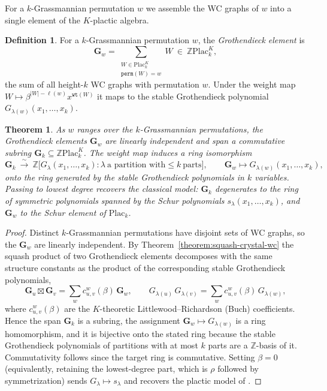 \documentclass{amsart}
\newtheorem{theorem}[lemma]{Theorem}
\theoremstyle{definition}
\newtheorem{definition}[lemma]{Definition}
\theoremstyle{remark}
\numberwithin{equation}{subsection}
\newcommand{\wof}[1]{\mathtt{perm}(#1)}
\newcommand{\wtt}{\mathtt{wt}}
\newcommand{\plac}{\mathrm{Plac}}
\newcommand{\kplac}{\mathrm{Plac}^K}
\begin{document}
For a $k$-Grassmannian permutation $w$ we assemble the WC graphs of $w$ into a
single element of the $K$-plactic algebra.

\begin{definition}\label{definition:groth-element}
For a $k$-Grassmannian permutation $w$, the \emph{Grothendieck element} is
$$\mathbf{G}_w=\sum_{\substack{W\in\kplac_k\\ \wof{W}=w}}W\ \in\ \mathbb{Z}\kplac_k,$$
the sum of all height-$k$ WC graphs with permutation $w$. Under the weight map
$W\mapsto\beta^{|W|-\ell(w)}x^{\wtt(W)}$ it maps to the stable Grothendieck
polynomial $G_{\lambda(w)}(x_1,\ldots,x_k)$.
\end{definition}

\begin{theorem}\label{theorem:groth-subring}
As $w$ ranges over the $k$-Grassmannian permutations, the Grothendieck elements
$\mathbf{G}_w$ are linearly independent and span a commutative subring
$\mathbf{G}_k\subseteq\mathbb{Z}\kplac_k$. The weight map induces a ring
isomorphism
$$\mathbf{G}_k\ \xrightarrow{\ \sim\ }\ \mathbb{Z}\bigl[G_{\lambda}(x_1,\ldots,x_k):\lambda\ \text{a partition with}\le k\ \text{parts}\bigr],\qquad
\mathbf{G}_w\longmapsto G_{\lambda(w)}(x_1,\ldots,x_k),$$
onto the ring generated by the stable Grothendieck polynomials in $k$ variables.
Passing to lowest degree recovers the classical model: $\mathbf{G}_k$ degenerates
to the ring of symmetric polynomials spanned by the Schur polynomials
$s_\lambda(x_1,\ldots,x_k)$, and $\mathbf{G}_w$ to the Schur element of
$\plac_k$.
\end{theorem}
\begin{proof}
Distinct $k$-Grassmannian permutations have disjoint sets of WC graphs, so the
$\mathbf{G}_w$ are linearly independent. By
Theorem~\ref{theorem:squash-crystal-wc} the squash product of two Grothendieck
elements decomposes with the same structure constants as the product of the
corresponding stable Grothendieck polynomials,
$$\mathbf{G}_u\boxtimes\mathbf{G}_v=\sum_{w}c^{w}_{u,v}(\beta)\,\mathbf{G}_w,
\qquad
G_{\lambda(u)}\,G_{\lambda(v)}=\sum_{w}c^{w}_{u,v}(\beta)\,G_{\lambda(w)},$$
where $c^{w}_{u,v}(\beta)$ are the $K$-theoretic Littlewood--Richardson
(Buch) coefficients. Hence the span $\mathbf{G}_k$ is a subring, the assignment
$\mathbf{G}_w\mapsto G_{\lambda(w)}$ is a ring homomorphism, and it is bijective
onto the stated ring because the stable Grothendieck polynomials of partitions
with at most $k$ parts are a $\mathbb{Z}$-basis of it. Commutativity follows since
the target ring is commutative. Setting $\beta=0$ (equivalently, retaining the
lowest-degree part, which is $\rho$ followed by symmetrization) sends
$G_\lambda\mapsto s_\lambda$ and recovers the plactic model of \cite{samuelmolev}.
\end{proof}
\end{document}
